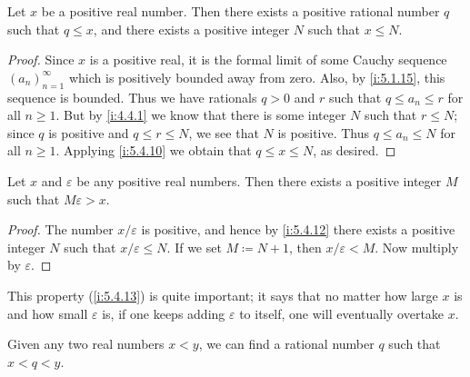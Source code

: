 \begin{prop}\label{i:5.4.12}
  Let \(x\) be a positive real number.
  Then there exists a positive rational number \(q\) such that \(q \leq x\), and there exists a positive integer \(N\) such that \(x \leq N\).
\end{prop}

\begin{proof}
  Since \(x\) is a positive real, it is the formal limit of some Cauchy sequence \((a_n)_{n = 1}^{\infty}\) which is positively bounded away from zero.
  Also, by \cref{i:5.1.15}, this sequence is bounded.
  Thus we have rationals \(q > 0\) and \(r\) such that \(q \leq a_n \leq r\) for all \(n \geq 1\).
  But by \cref{i:4.4.1} we know that there is some integer \(N\) such that \(r \leq N\);
  since \(q\) is positive and \(q \leq r \leq N\), we see that \(N\) is positive.
  Thus \(q \leq a_n \leq N\) for all \(n \geq 1\).
  Applying \cref{i:5.4.10} we obtain that \(q \leq x \leq N\), as desired.
\end{proof}

\begin{cor}\label{i:5.4.13}
  Let \(x\) and \(\varepsilon\) be any positive real numbers.
  Then there exists a positive integer \(M\) such that \(M\varepsilon > x\).
\end{cor}

\begin{proof}
  The number \(x / \varepsilon\) is positive, and hence by \cref{i:5.4.12} there exists a positive integer \(N\) such that \(x / \varepsilon \leq N\).
  If we set \(M \coloneqq N + 1\), then \(x / \varepsilon < M\).
  Now multiply by \(\varepsilon\).
\end{proof}

\begin{note}
  This property (\cref{i:5.4.13}) is quite important;
  it says that no matter how large \(x\) is and how small \(\varepsilon\) is, if one keeps adding \(\varepsilon\) to itself, one will eventually overtake \(x\).
\end{note}

\begin{prop}\label{i:5.4.14}
  Given any two real numbers \(x < y\), we can find a rational number \(q\) such that \(x < q < y\).
\end{prop}

